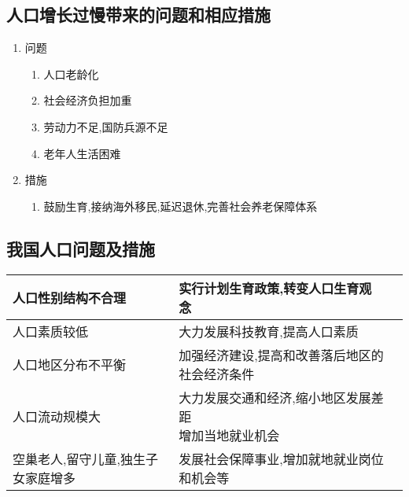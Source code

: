 \documentclass[a4paper]{article}
\begin{document}
    \subsection{人口增长过慢带来的问题和相应措施}
    \begin{enumerate}
        \item 问题
        \begin{enumerate}
            \item 人口老龄化
            \item 社会经济负担加重
            \item 劳动力不足,国防兵源不足
            \item 老年人生活困难
        \end{enumerate}
        \item 措施
        \begin{enumerate}
            \item 鼓励生育,接纳海外移民,延迟退休,完善社会养老保障体系
        \end{enumerate}
    \end{enumerate}
    \subsection{我国人口问题及措施}
    \begin{table}[h]%
        \begin{tabular}{|p{35mm}|l|l|}
            \hline
            人口性别结构不合理 & 实行计划生育政策,转变人口生育观念 \\
            \hline
            人口素质较低 & 大力发展科技教育,提高人口素质 \\
            \hline
            人口地区分布不平衡 & 加强经济建设,提高和改善落后地区的社会经济条件 \\
            \hline
            人口流动规模大 & \makecell[l]{大力发展交通和经济,缩小地区发展差距 \\ 增加当地就业机会} \\
            \hline
            空巢老人,留守儿童,独生子女家庭增多 & 发展社会保障事业,增加就地就业岗位和机会等 \\
            \hline
        \end{tabular}
    \end{table}
\end{document}
